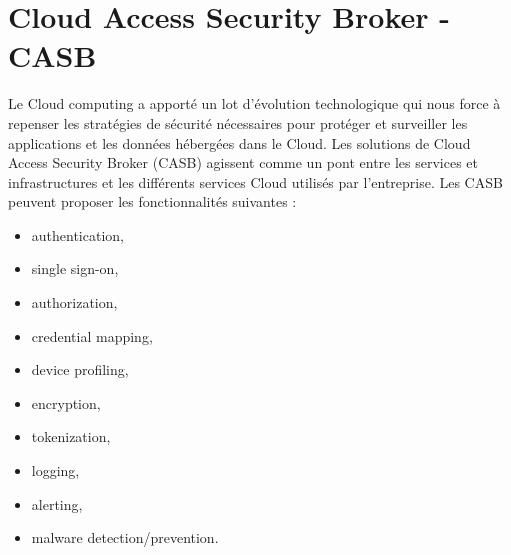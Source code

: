 

\section{Cloud Access Security Broker - CASB}
Le Cloud computing a apporté un lot d'évolution technologique qui nous force à repenser les stratégies de sécurité nécessaires pour protéger et surveiller les applications et les données hébergées dans le Cloud.
Les solutions de Cloud Access Security Broker (CASB) agissent comme un pont entre les services et infrastructures  et les différents services Cloud utilisés par l'entreprise.
Les CASB peuvent proposer les fonctionnalités suivantes : 
\begin{itemize}
    \item authentication,
    \item single sign-on, 
   \item  authorization, 
   \item  credential mapping, 
    \item device profiling, 
    \item encryption, 
    \item tokenization, 
   \item  logging, 
    \item alerting, 
    \item malware detection/prevention.
\end{itemize}


